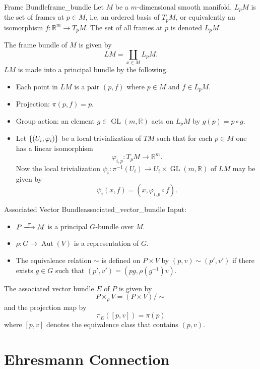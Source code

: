 \documentclass{article}
\begin{document}
\begin{example}{Frame Bundle}{frame_bundle}
    Let $M$ be a $m$-dimensional smooth manifold.
    $L_p M$ is the set of frames at $p\in M$,
    i.e. an ordered basis of $T_p M$,
    or equivalently an isomorphism $f: \mathbb{R}^m \rightarrow T_p M$.
    The set of all frames at $p$ is denoted $L_p M$.
    
    The frame bundle of $M$ is given by
    \[ LM = \coprod_{x\in M} L_p M. \]
    $LM$ is made into a principal bundle by the following.
    \begin{itemize}
        \item Each point in $LM$ is a pair $(p, f)$ where $p\in M$ and $f\in L_p M$.
        \item Projection: $\pi(p,f) = p$.
        \item Group action: an element $g\in \operatorname{GL}(m,\mathbb{R})$ acts on $L_p M$ by
        $g(p) = p \circ g$.
        \item Let $\qty{(U_i,\varphi_i)}$ be a local trivialization of $TM$ such that for each $p\in M$ one has a linear isomorphism
        \[ \varphi_{i,p}: T_p M \rightarrow \mathbb{R}^m. \]
        Now the local trivialization $\psi_{i}: \pi^{-1}(U_i)\rightarrow U_i \times \operatorname{GL}(m,\mathbb{R})$ of $LM$ may be given by
        \[ \psi_i(x,f) = (x,\varphi_{i,p} \circ f). \]
    \end{itemize}
\end{example}

\begin{definition}{Associated Vector Bundle}{associated_vector_bundle}
    Input:
    \begin{itemize}
        \item $P\xlongrightarrow{\pi} M$ is a principal $G$-bundle over $M$.
        \item $\rho: G\rightarrow \operatorname{Aut}(V)$ is a representation of $G$.
        \item The equivalence relation $\sim$ is defined on $P\times V$ by $(p,v)\sim (p',v')$ if there exists $g\in G$ such that $(p',v') = (pg, \rho(g^{-1})v)$.
    \end{itemize}
    The associated vector bundle $E$ of $P$ is given by
    \[ P\times_\rho V = (P\times V)/\sim \]
    and the projection map by
    \[ \pi_E([p, v]) = \pi(p) \]
    where $[p,v]$ denotes the equivalence class that contains $(p,v)$.
\end{definition}

\section{Ehresmann Connection}
\end{document}
